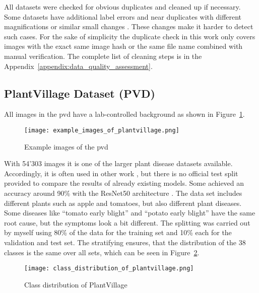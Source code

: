 All datasets were checked for obvious duplicates and cleaned up if necessary. Some datasets have additional label errors and near duplicates with different magnifications or similar small changes \autocite{groeger2023}. These changes make it harder to detect such cases. For the sake of simplicity the duplicate check in this work only covers images with the exact same image hash or the same file name combined with manual verification. The complete list of cleaning steps is in the Appendix~\ref{appendix:data_quality_assessment}.

\subsection{PlantVillage Dataset (PVD)}
All images in the \gls{pvd} have a lab-controlled background as shown in Figure~\ref{fig:example_images_of_plantvillage}. 
\begin{figure}[H]
    \begin{center}
    \texttt{[image: example\_images\_of\_plantvillage.png]}
    \caption{Example images of the \gls{pvd}}\label{fig:example_images_of_plantvillage}
    \end{center}
\end{figure}
With 54'303 images it is one of the larger plant disease datasets available. Accordingly, it is often used in other work \autocite{hughes2016}, but there is no official test split provided to compare the results of already existing models. Some achieved an accuracy around 90\% with the ResNet50 architecture \autocite{gole2023}.
The data set includes different plants such as apple and tomatoes, but also different plant diseases. Some diseases like ``tomato early blight'' and ``potato early blight'' have the same root cause, but the symptoms look a bit different. 
The splitting was carried out by myself using 80\% of the data for the training set and 10\% each for the validation and test set. The stratifying ensures, that the distribution of the 38 classes is the same over all sets, which can be seen in Figure~\ref{fig:class_distribution_of_plantvillage}.
\begin{figure}[H]
    \begin{center}
    \texttt{[image: class\_distribution\_of\_plantvillage.png]}
    \caption{Class distribution of PlantVillage}\label{fig:class_distribution_of_plantvillage}
    \end{center}
\end{figure}

